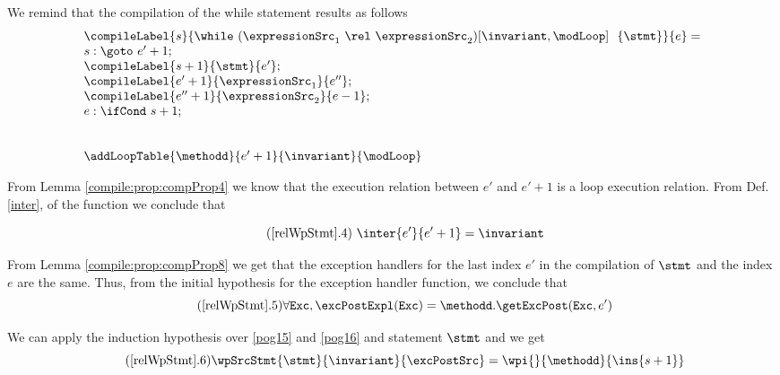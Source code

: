 \begin{description}
   
We remind that the compilation of the while statement results as follows 
\begin{equation*} %
       \begin{array}{l} \compileLabel{s}{\while \ (\expressionSrc_1 \ \rel  \ \expressionSrc_2) \lbrack \invariant, \modLoop \rbrack \ \do \ \{ \stmt \} }{e} = \\
	       s: \goto \ e' + 1; \\
	       \compileLabel{s +  1}{\stmt}{e' }; \\
	       \compileLabel{e' +  1}{\expressionSrc_1}{e''};\\
	       \compileLabel{e'' +  1}{\expressionSrc_2}{e-1};\\
	       e : \ifCond \ s +  1; \\
	       \\\\
	       \addLoopTable{\methodd}{e'+1}{\invariant }{\modLoop} \end{array}
 \end{equation*}

From Lemma \ref{compile:prop:compProp4} we know that the execution relation between $e'$ and $e'+1$ is a loop execution relation. From Def. \ref{inter}, \pageref{inter} 
     of the function \interOnly{} we conclude that  

\begin{equation*} \label{pog15}    \tag{\ref{relWpStmt}.4}  \
               \inter{e'}{e'+1} = \invariant \end{equation*}

From Lemma \ref{compile:prop:compProp8} we get that the exception handlers for the last index $e'$ in the compilation of $\stmt$ and the index $e$ are the same.
Thus, from the initial hypothesis for the exception handler function, we conclude that  
\begin{equation*} \label{pog16}    \tag{\ref{relWpStmt}.5}  
 \forall \mbox{\rm\texttt{Exc}} ,  \excPostExpl( \mbox{\rm\texttt{Exc}} ) = \methodd.\getExcPost(\mbox{\rm\texttt{Exc}}, e' )  \end{equation*}

We can apply the  induction hypothesis over \eqref{pog15} and \eqref{pog16}   and  statement $\stmt$ and we get 
\begin{equation*} \label{pog17}    \tag{\ref{relWpStmt}.6}   \wpSrcStmt{ \stmt }{\invariant} {\excPostSrc} =  \wpi{}{\methodd}{\ins{s+1}} \end{equation*}


\end{description}
